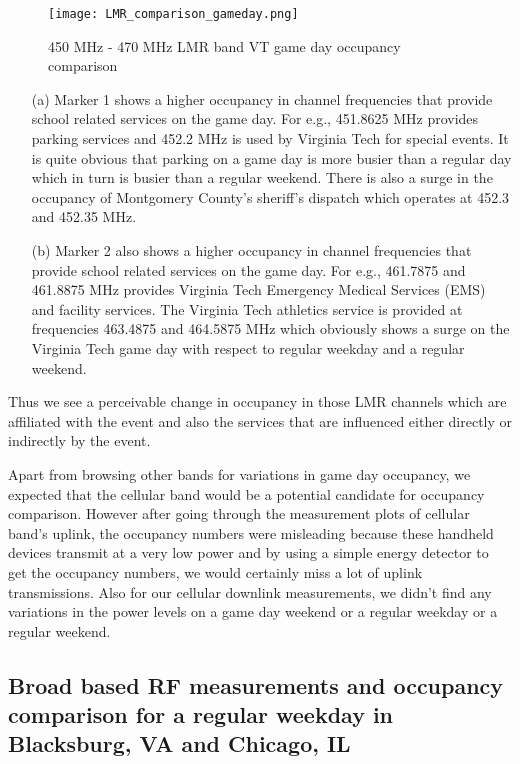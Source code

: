 \documentclass[12pt,sts]{report}
\begin{document}
		\begin{figure}[ht!]
			\centering
				\texttt{[image: LMR\_comparison\_gameday.png]}
			\caption{450 MHz - 470 MHz LMR band VT game day occupancy comparison}
		\end{figure}
		
		\begin{enumerate}
			\item[(a)] Marker 1 shows a higher occupancy in channel frequencies that provide school related services on the game day. For e.g., 451.8625 MHz provides parking services and 452.2 MHz is used by Virginia Tech for special events. It is quite obvious that parking on a game day is more busier than a regular day which in turn is busier than a regular weekend. There is also a surge in the occupancy of Montgomery County's sheriff's dispatch which operates at 452.3 and 452.35 MHz.
			\item[(b)] Marker 2 also shows a higher occupancy in channel frequencies that provide school related services on the game day. For e.g., 461.7875 and 461.8875 MHz provides Virginia Tech Emergency Medical Services (EMS) and facility services. The Virginia Tech athletics service is provided at frequencies 463.4875 and 464.5875 MHz which obviously shows a surge on the Virginia Tech game day with respect to regular weekday and a regular weekend.
		\end{enumerate}
		
		Thus we see a perceivable change in occupancy in those LMR channels which are affiliated with the event and also the services that are influenced either directly or indirectly by the event.
		
		Apart from browsing other bands for variations in game day occupancy, we expected that the cellular band would be a potential candidate for occupancy comparison. However after going through the measurement plots of cellular band's uplink, the occupancy numbers were misleading because these handheld devices transmit at a very low power and by using a simple energy detector to get the occupancy numbers, we would certainly miss a lot of uplink transmissions. Also for our cellular downlink measurements, we didn't find any variations in the power levels on a game day weekend or a regular weekday or a regular weekend. 
 	
	\subsection{Broad based RF measurements and occupancy comparison for a regular weekday in Blacksburg, VA and Chicago, IL}
	
\end{document}
